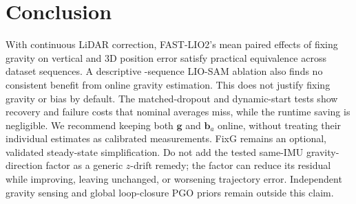 \section{Conclusion}
\label{sec:conclusion}

With continuous LiDAR correction, FAST-LIO2's mean paired effects of fixing gravity
on vertical and 3D position error satisfy practical equivalence across
\NumCoreSeq{} dataset sequences. A descriptive
\NumLioSamSeq{}-sequence LIO-SAM ablation also
finds no consistent benefit from online gravity estimation. This does not
justify fixing gravity or bias by default. The
matched-dropout and dynamic-start tests show recovery and failure costs that
nominal averages miss, while the runtime saving is negligible. We recommend
keeping both $\mathbf g$ and $\mathbf b_a$ online, without treating their
individual estimates as calibrated measurements. FixG remains an optional,
validated steady-state simplification.
Do not add the tested same-IMU gravity-direction factor as a generic $z$-drift
remedy; the factor can reduce its residual while improving, leaving unchanged,
or worsening trajectory error. Independent gravity sensing and global loop-closure PGO priors remain
outside this claim.
